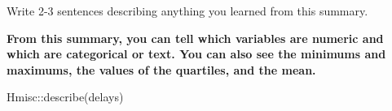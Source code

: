 \documentclass[
  letterpaper,
  DIV=11,
  numbers=noendperiod]{scrartcl}
\newenvironment{Shaded}{\begin{snugshade}}{\end{snugshade}}
\newcommand{\FunctionTok}[1]{\textcolor[rgb]{0.28,0.35,0.67}{#1}}
\newcommand{\NormalTok}[1]{\textcolor[rgb]{0.00,0.23,0.31}{#1}}
\newcommand{\SpecialCharTok}[1]{\textcolor[rgb]{0.37,0.37,0.37}{#1}}
\begin{document}
Write 2-3 sentences describing anything you learned from this summary.

\begin{tcolorbox}[enhanced jigsaw, colback=white, breakable, arc=.35mm, left=2mm, colframe=quarto-callout-warning-color-frame, opacityback=0, rightrule=.15mm, toprule=.15mm, bottomrule=.15mm, leftrule=.75mm]

\textbf{From this summary, you can tell which variables are numeric and
which are categorical or text. You can also see the minimums and
maximums, the values of the quartiles, and the mean.}

\end{tcolorbox}

\begin{Shaded}
\begin{Highlighting}[]
\NormalTok{Hmisc}\SpecialCharTok{::}\FunctionTok{describe}\NormalTok{(delays)}
\end{Highlighting}
\end{Shaded}
\end{document}
